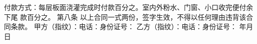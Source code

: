 \documentclass[12pt,a4paper]{article}
\begin{document}
付款方式：每层板面浇灌完成时付款百分之\textunderscore\textunderscore\textunderscore。室内外粉水、门窗、小口收完便付余下尾
款百分之\textunderscore\textunderscore\textunderscore。
\newline{}
\newline{}
第八条
\newline{}
以上合同一式两份，签字生效，不得以任何理由违背该合同条款。
\newline{}
\newline{}
甲方（指纹）：\hspace*{2cm}电话：\hspace*{3cm}身份证号：
\newline{}
\newline{}
\newline{}
乙方（指纹）：\hspace*{2cm}电话：\hspace*{3cm}身份证号：
\newline{}
\hspace*{8cm}年\hspace*{1cm}月\hspace*{1cm}日






\clearpage
\end{document}
